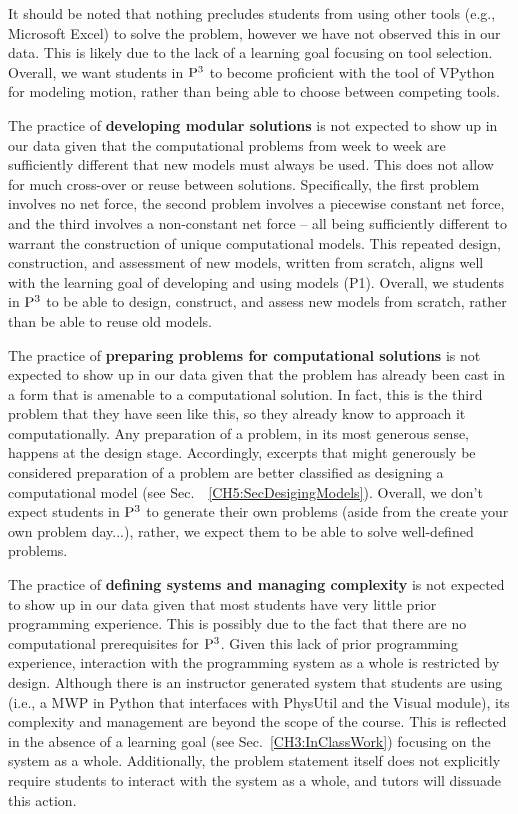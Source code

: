 \documentclass{msuphddissertation}
\begin{document}
\begin{doublespace}
\begin{appendices}
It should be noted that nothing precludes students from using other tools (e.g., Microsoft Excel) to solve the problem, however we have not observed this in our data.  This is likely due to the lack of a learning goal focusing on tool selection.  Overall, we want students in ${\rm P}^{3}$ to become proficient with the tool of VPython for modeling motion, rather than being able to choose between competing tools.

The practice of \textbf{developing modular solutions} is not expected to show up in our data given that the computational problems from week to week are sufficiently different that new models must always be used.  This does not allow for much cross-over or reuse between solutions.  Specifically, the first problem involves no net force, the second problem involves a piecewise constant net force, and the third involves a non-constant net force -- all being sufficiently different to warrant the construction of unique computational models.  This repeated design, construction, and assessment of new models, written from scratch, aligns well with the learning goal of developing and using models (P1).  Overall, we students in ${\rm P}^{3}$ to be able to design, construct, and assess new models from scratch, rather than be able to reuse old models.

The practice of \textbf{preparing problems for computational solutions} is not expected to show up in our data given that the problem has already been cast in a form that is amenable to a computational solution.  In fact, this is the third problem that they have seen like this, so they already know to approach it computationally.  Any preparation of a problem, in its most generous sense, happens at the design stage.  Accordingly, excerpts that might generously be considered preparation of a problem are better classified as designing a computational model (see Sec.~~\ref{CH5:SecDesigingModels}).  Overall, we don't expect students in ${\rm P}^{3}$ to generate their own problems (aside from the create your own problem day...), rather, we expect them to be able to solve well-defined problems.

The practice of \textbf{defining systems and managing complexity} is not expected to show up in our data given that most students have very little prior programming experience.  This is possibly due to the fact that there are no computational prerequisites for ${\rm P}^{3}$.  Given this lack of prior programming experience, interaction with the programming system as a whole is restricted by design.  Although there is an instructor generated system that students are using (i.e., a MWP in Python that interfaces with PhysUtil and the Visual module), its complexity and management are beyond the scope of the course.  This is reflected in the absence of a learning goal (see Sec.~\ref{CH3:InClassWork}) focusing on the system as a whole.  Additionally, the problem statement itself does not explicitly require students to interact with the system as a whole, and tutors will dissuade this action.


\end{appendices}
\end{doublespace}
\end{document}
